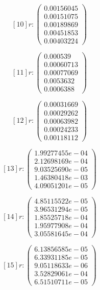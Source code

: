 \documentclass{article}
\begin{document}
   
   
$$ [10] r: \left(\begin{matrix}
    0.00156045 \\
    0.00151075 \\
    0.00189869 \\
    0.00451853 \\
    0.00403224
\end{matrix}\right) $$
   
   
$$ [11] r: \left(\begin{matrix}
    0.000539   \\
    0.00060713 \\
    0.00077069 \\
    0.0053632  \\
    0.0006388 
\end{matrix}\right) $$
   
   
$$ [12] r: \left(\begin{matrix}
    0.00031669 \\
    0.00029262 \\
    0.00063982 \\
    0.00024233 \\
    0.00118112
\end{matrix}\right) $$
   
   
$$ [13] r: \left(\begin{matrix}
    1.99277455e-04 \\
    2.12698169e-04 \\
    9.03525690e-05 \\
    1.46380418e-03 \\
    4.09051201e-05
\end{matrix}\right) $$   

   
$$ [14] r: \left(\begin{matrix}
    4.85115522e-05 \\
    3.96531294e-05 \\
    1.85525718e-04 \\
    1.95977908e-04 \\
    3.05581645e-04
\end{matrix}\right) $$   

     
$$ [15] r:\left(\begin{matrix}
    6.13856585e-05 \\
    6.33931185e-05 \\
    9.05118633e-06 \\
    3.52829061e-04 \\
    6.51510711e-05
\end{matrix}\right) $$
\end{document}
